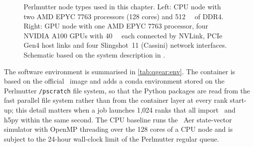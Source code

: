 \begin{figure}[htbp]
\caption{Perlmutter node types used in this chapter. Left: CPU node with two AMD EPYC 7763 processors (128 cores) and \SI{512}{\giga\byte} of DDR4. Right: GPU node with one AMD EPYC 7763 processor, four NVIDIA A100 GPUs with \SI{40}{\giga\byte} each connected by NVLink, PCIe Gen4 host links and four Slingshot~11 (Cassini) network interfaces. Schematic based on the system description in \cite{guo2025qgear}.}
\label{fig:qgear:perlmutter}
\end{figure}

The software environment is summarised in \cref{tab:qgear:env}. The container is based on the official \cudaq\ image and adds a conda environment stored on the Perlmutter \texttt{/pscratch} file system, so that the Python packages are read from the fast parallel file system rather than from the container layer at every rank start-up; this detail matters when a job launches 1,024 ranks that all import \qiskit\ and h5py within the same second. The CPU baseline runs the \qiskit\ Aer state-vector simulator with OpenMP threading over the 128 cores of a CPU node and is subject to the 24-hour wall-clock limit of the Perlmutter regular queue.

